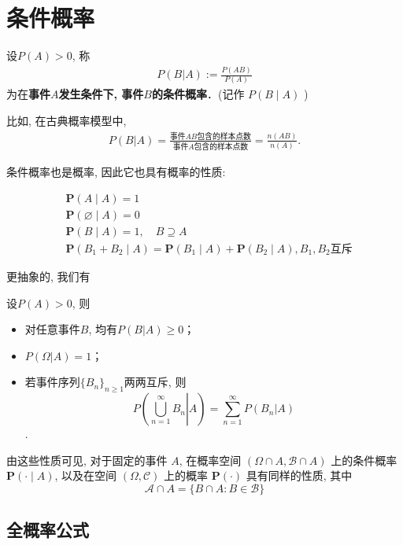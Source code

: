 \section{条件概率}

\begin{definition}
    设$P(A)>0$, 称
    \begin{align*}
        P(B|A):=\frac{P(AB)}{P(A)}
    \end{align*}
    为在\textbf{事件$A$发生条件下, 事件$B$的条件概率}．(记作 $P(B \mid A)$ )
\end{definition}

比如, 在古典概率模型中, 
\begin{align*}
    P(B|A)=\frac{\mbox{事件$AB$包含的样本点数}}{\mbox{事件$A$包含的样本点数}}=\frac{n(AB)}{n(A)}.
\end{align*}

条件概率也是概率, 因此它也具有概率的性质:

$$
\begin{aligned}
& \mathbf{P}(A \mid A)=1 \\
& \mathbf{P}(\varnothing \mid A)=0 \\
& \mathbf{P}(B \mid A)=1, \quad B \supseteq A \\
& \mathbf{P}\left(B_1+B_2 \mid A\right)=\mathbf{P}\left(B_1 \mid A\right)+\mathbf{P}\left(B_2 \mid A\right), B_1,B_2\text{互斥}
\end{aligned}
$$

更抽象的, 我们有

\begin{proposition}
    设$P(A)>0$, 则
    \begin{itemize}
        \item 对任意事件$B$, 均有$P(B|A)\ge 0$；
        \item $P(\Omega|A)=1$；
        \item 若事件序列$\{B_n\}_{n\ge 1}$两两互斥, 则
              $$P\left( \left. \bigcup_{n=1}^{\infty} B_n \right| A\right)=\sum_{n=1}^{\infty} P(B_n|A)$$
              .
    \end{itemize}
\end{proposition}

由这些性质可见, 对于固定的事件 $A$, 在概率空间 $(\Omega \cap A, \mathscr{B} \cap A)$ 上的条件概率 $\mathbf{P}(\cdot \mid A)$, 以及在空间 $(\Omega, \mathscr{C})$ 上的概率 $\mathbf{P}(\cdot)$ 具有同样的性质, 其中
$$
\mathscr{A} \cap A=\{B \cap A: B \in \mathscr{B}\}
$$

\subsection*{全概率公式}

